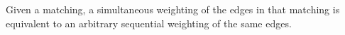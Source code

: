 \begin{prp}
  \label{prop:dgmm-edge-order}
  Given a matching, a simultaneous weighting of the edges in that matching is equivalent to an arbitrary sequential weighting of the same edges.
\end{prp}


